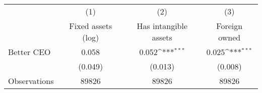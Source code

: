 {
\def\sym#1{\ifmmode^{#1}\else\(^{#1}\)\fi}
\begin{tabular}{l*{3}{c}}
\hline\hline
                    &\multicolumn{1}{c}{(1)}&\multicolumn{1}{c}{(2)}&\multicolumn{1}{c}{(3)}\\
                    &\multicolumn{1}{c}{Fixed assets (log)}&\multicolumn{1}{c}{Has intangible assets}&\multicolumn{1}{c}{Foreign owned}\\
\hline
Better CEO          &       0.058         &       0.052\sym{***}&       0.025\sym{***}\\
                    &     (0.049)         &     (0.013)         &     (0.008)         \\
\hline
Observations        &       89826         &       89826         &       89826         \\
\hline\hline
\end{tabular}
}
